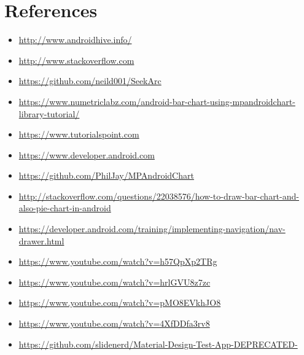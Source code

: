 \documentclass[a4paper,12pt,oneside]{book}
\begin{document}
\section*{References}
\begin{itemize}
    \item \href {http://www.androidhive.info/}{http://www.androidhive.info/}
    \item \href {http://www.stackoverflow.com}{http://www.stackoverflow.com}
	\item \href {https://github.com/neild001/SeekArc}{https://github.com/neild001/SeekArc}
	\item \href {https://www.numetriclabz.com/android-bar-chart-using-mpandroidchart-library-tutorial/}{https://www.numetriclabz.com/android-bar-chart-using-mpandroidchart-library-tutorial/}
	\item \href {https://www.tutorialspoint.com}{https://www.tutorialspoint.com}
	\item \href {https://www.developer.android.com}{https://www.developer.android.com}
	\item \href {https://github.com/PhilJay/MPAndroidChart}{https://github.com/PhilJay/MPAndroidChart}
	\item \href {http://stackoverflow.com/questions/22038576/how-to-draw-bar-chart-and-also-pie-chart-in-android}{http://stackoverflow.com/questions/22038576/how-to-draw-bar-chart-and-also-pie-chart-in-android}
	\item \href {https://developer.android.com/training/implementing-navigation/nav-drawer.html}{https://developer.android.com/training/implementing-navigation/nav-drawer.html}
	\item \href {https://www.youtube.com/watch?v=h57QpXp2TRg}{https://www.youtube.com/watch?v=h57QpXp2TRg}
	\item \href {https://www.youtube.com/watch?v=hrlGVU8z7zc}{https://www.youtube.com/watch?v=hrlGVU8z7zc}
	\item \href {https://www.youtube.com/watch?v=pMO8EVkhJO8}{https://www.youtube.com/watch?v=pMO8EVkhJO8}
	\item \href {https://www.youtube.com/watch?v=4XfDDfa3rv8}{https://www.youtube.com/watch?v=4XfDDfa3rv8}
	\item \href {https://github.com/slidenerd/Material-Design-Test-App-DEPRECATED-}{https://github.com/slidenerd/Material-Design-Test-App-DEPRECATED-}
\end{itemize}
\end{document}
